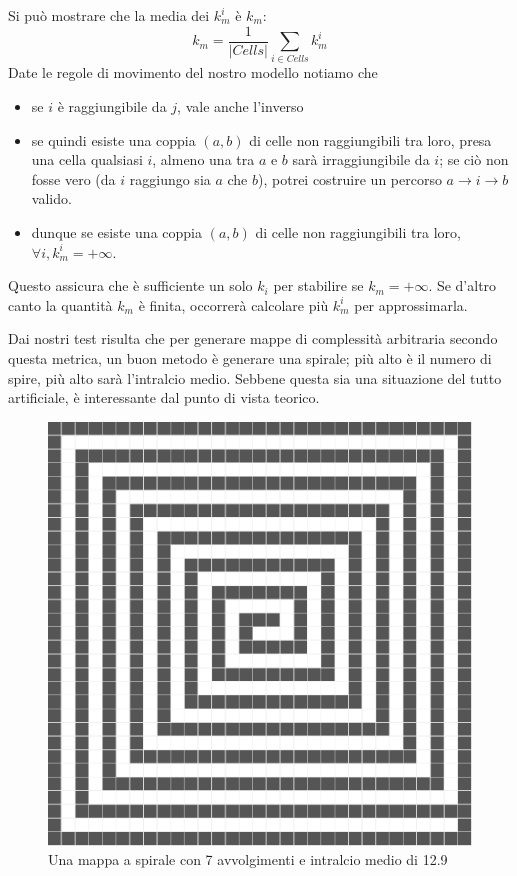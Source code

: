  Si può mostrare che la media dei $k_m^i$ è $k_m$:
  $$k_m = \frac{1}{|Cells|}\sum_{i \in Cells} k_m^i$$
  Date le regole di movimento del nostro modello notiamo che
  \begin{itemize}
  	\item se $i$ è raggiungibile da $j$, vale anche l'inverso
    \item se quindi esiste una coppia $(a,b)$ di celle non raggiungibili tra
	      loro, presa una cella qualsiasi $i$, almeno una tra $a$ e $b$ sarà
          irraggiungibile da $i$; se ciò non fosse vero (da $i$ raggiungo sia
          $a$ che $b$), potrei costruire un percorso $a \rightarrow i
          \rightarrow b$ valido.
    \item dunque se esiste una coppia $(a,b)$ di celle non raggiungibili tra
	      loro, $\forall i, k_m^i = +\infty$.
  \end{itemize}
  Questo assicura che è sufficiente un solo $k_i$ per stabilire se $k_m = +\infty$.
  Se d'altro canto la quantità $k_m$ è finita, occorrerà calcolare più $k_m^i$ per 
  approssimarla.
  
  Dai nostri test risulta che per generare mappe di complessità arbitraria
  secondo questa metrica, un buon metodo è generare una spirale; più alto è il
  numero di spire, più alto sarà l'intralcio medio. Sebbene questa sia una 
  situazione del tutto artificiale, è interessante dal punto di vista teorico.
  \begin{figure}[H]
  \centering
  \includegraphics[width=.6\textwidth]{./immagini/mspirale.pdf}
  \caption{Una mappa a spirale con 7 avvolgimenti e intralcio medio di 12.9}
  \end{figure}

